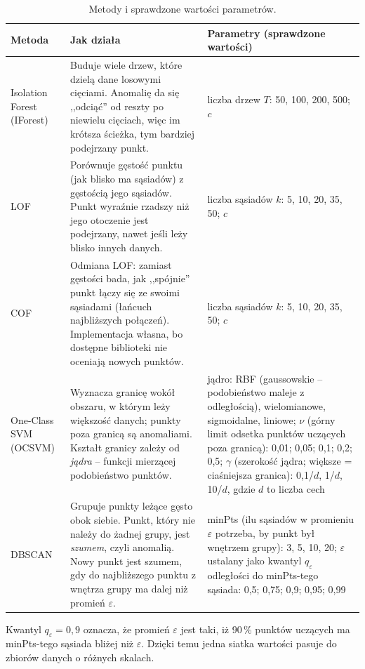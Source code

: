 \documentclass[11pt,a4paper]{article}
\begin{document}
\begin{table}[H]
  \centering\small
  \caption{Metody i sprawdzone wartości parametrów.}
  \label{tab:methods}
  \begin{tabular}{L{2.1cm}L{7.6cm}L{5.2cm}}
    \toprule
    Metoda & Jak działa & Parametry (sprawdzone wartości) \\
    \midrule
    Isolation Forest (IForest) & Buduje wiele drzew, które dzielą dane losowymi
    cięciami. Anomalię da się ,,odciąć'' od reszty po niewielu cięciach, więc
    im krótsza ścieżka, tym bardziej podejrzany punkt. &
    liczba drzew $T$: 50, 100, 200, 500; $c$ \\
    \addlinespace
    LOF & Porównuje gęstość punktu (jak blisko ma sąsiadów) z gęstością jego
    sąsiadów. Punkt wyraźnie rzadszy niż jego otoczenie jest podejrzany,
    nawet jeśli leży blisko innych danych. &
    liczba sąsiadów $k$: 5, 10, 20, 35, 50; $c$ \\
    \addlinespace
    COF & Odmiana LOF: zamiast gęstości bada, jak ,,spójnie'' punkt łączy się ze
    swoimi sąsiadami (łańcuch najbliższych połączeń). Implementacja własna,
    bo dostępne biblioteki nie oceniają nowych punktów. &
    liczba sąsiadów $k$: 5, 10, 20, 35, 50; $c$ \\
    \addlinespace
    One-Class SVM (OCSVM) & Wyznacza granicę wokół obszaru, w którym leży
    większość danych; punkty poza granicą są anomaliami. Kształt granicy
    zależy od \emph{jądra} -- funkcji mierzącej podobieństwo punktów. &
    jądro: RBF (gaussowskie -- podobieństwo maleje z odległością), wielomianowe,
    sigmoidalne, liniowe; $\nu$ (górny limit odsetka
    punktów uczących poza granicą): 0,01; 0,05; 0,1; 0,2; 0,5;
    $\gamma$ (szerokość jądra; większe = ciaśniejsza granica): 0,1/$d$, 1/$d$,
    10/$d$, gdzie $d$ to liczba cech \\
    \addlinespace
    DBSCAN & Grupuje punkty leżące gęsto obok siebie. Punkt, który nie
    należy do żadnej grupy, jest \emph{szumem}, czyli anomalią. Nowy punkt
    jest szumem, gdy do najbliższego punktu z wnętrza grupy ma dalej niż
    promień $\varepsilon$. &
    minPts (ilu sąsiadów w promieniu $\varepsilon$ potrzeba, by punkt był
    wnętrzem grupy): 3, 5, 10, 20; $\varepsilon$ ustalany jako kwantyl
    $q_\varepsilon$ odległości do minPts-tego sąsiada: 0,5; 0,75; 0,9; 0,95;
    0,99 \\
    \bottomrule
  \end{tabular}
\end{table}

Kwantyl $q_\varepsilon=0{,}9$ oznacza, że promień $\varepsilon$ jest taki, iż
90\,\% punktów uczących ma minPts-tego sąsiada bliżej niż $\varepsilon$.
Dzięki temu jedna siatka wartości pasuje do zbiorów danych o różnych skalach.
\end{document}
